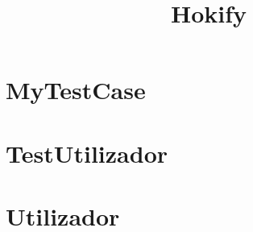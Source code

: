 \documentclass{article}
\begin{document}
\title{Hokify}
\author{}
\maketitle
\tableofcontents

\section{MyTestCase}

\section{TestUtilizador}

\section{Utilizador}

\end{document}
